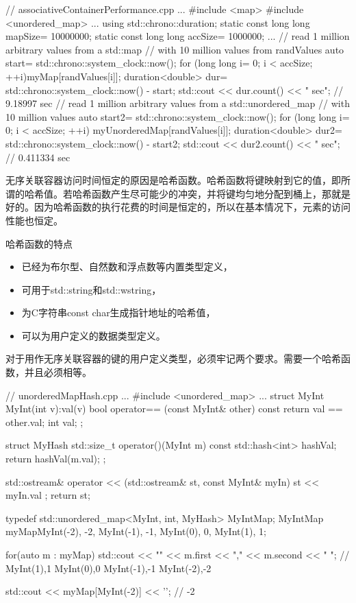 \begin{cpp}
// associativeContainerPerformance.cpp
...
#include <map>
#include <unordered_map>
...
using std::chrono::duration;
static const long long mapSize= 10000000;
static const long long accSize= 1000000;
...
// read 1 million arbitrary values from a std::map
// with 10 million values from randValues
auto start= std::chrono::system_clock::now();
for (long long i= 0; i < accSize; ++i){myMap[randValues[i]];}
duration<double> dur= std::chrono::system_clock::now() - start;
std::cout << dur.count() << " sec"; // 9.18997 sec
// read 1 million arbitrary values from a std::unordered_map
// with 10 million values
auto start2= std::chrono::system_clock::now();
for (long long i= 0; i < accSize; ++i){ myUnorderedMap[randValues[i]];}
duration<double> dur2= std::chrono::system_clock::now() - start2;
std::cout << dur2.count() << " sec"; // 0.411334 sec
\end{cpp}



无序关联容器访问时间恒定的原因是哈希函数。哈希函数将键映射到它的值，即所谓的哈希值。若哈希函数产生尽可能少的冲突，并将键均匀地分配到桶上，那就是好的。因为哈希函数的执行花费的时间是恒定的，所以在基本情况下，元素的访问性能也恒定。

哈希函数的特点

\begin{itemize}
\item
已经为布尔型、自然数和浮点数等内置类型定义，

\item
可用于std::string和std::wstring，

\item
为C字符串const char生成指针地址的哈希值，

\item
可以为用户定义的数据类型定义。
\end{itemize}

对于用作无序关联容器的键的用户定义类型，必须牢记两个要求。需要一个哈希函数，并且必须相等。


\begin{cpp}
// unorderedMapHash.cpp
...
#include <unordered_map>
...
struct MyInt{
	MyInt(int v):val(v){}
	bool operator== (const MyInt& other) const {
		return val == other.val;
	}
	int val;
};

struct MyHash{
	std::size_t operator()(MyInt m) const {
		std::hash<int> hashVal;
		return hashVal(m.val);
	}
};

std::ostream& operator << (std::ostream& st, const MyInt& myIn){
	st << myIn.val ;
	return st;
}

typedef std::unordered_map<MyInt, int, MyHash> MyIntMap;
MyIntMap myMap{{MyInt(-2), -2}, {MyInt(-1), -1}, {MyInt(0), 0}, {MyInt(1), 1}};

for(auto m : myMap) std::cout << "{" << m.first << "," << m.second << "} ";
	// {MyInt(1),1} {MyInt(0),0} {MyInt(-1),-1} {MyInt(-2),-2}

std::cout << myMap[MyInt(-2)] << '\n'; // -2
\end{cpp}

